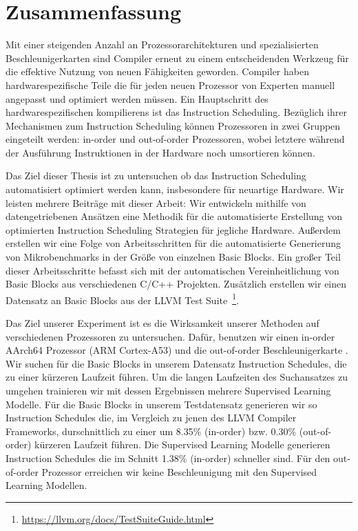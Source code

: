\chapter*{Zusammenfassung}
Mit einer steigenden Anzahl an Prozessorarchitekturen und spezialisierten Beschleunigerkarten sind Compiler erneut zu einem entscheidenden Werkzeug für die effektive Nutzung von neuen Fähigkeiten geworden.
Compiler haben hardwarespezifische Teile die für jeden neuen Prozessor von Experten manuell angepasst und optimiert werden müssen.
Ein Hauptschritt des hardwarespezifischen kompilierens ist das Instruction Scheduling.
Bezüglich ihrer Mechanismen zum Instruction Scheduling können Prozessoren in zwei Gruppen eingeteilt werden: in-order und out-of-order Prozessoren, wobei letztere während der Ausführung Instruktionen in der Hardware noch umsortieren können.

Das Ziel dieser Thesis ist zu untersuchen ob das Instruction Scheduling automatisiert optimiert werden kann, insbesondere für neuartige Hardware.
Wir leisten mehrere Beiträge mit dieser Arbeit:
Wir entwickeln mithilfe von datengetriebenen Ansätzen eine Methodik für die automatisierte Erstellung von optimierten Instruction Scheduling Strategien für jegliche Hardware.
Außerdem erstellen wir eine Folge von Arbeitsschritten für die automatisierte Generierung von Mikrobenchmarks in der Größe von einzelnen Basic Blocks.
Ein großer Teil dieser Arbeitsschritte befasst sich mit der automatischen Vereinheitlichung von Basic Blocks aus verschiedenen C/C++ Projekten.
Zusätzlich erstellen wir einen Datensatz an Basic Blocks aus der LLVM Test Suite~\footnote[1]{\url{https://llvm.org/docs/TestSuiteGuide.html}}.

Das Ziel unserer Experiment ist es die Wirksamkeit unserer Methoden auf verschiedenen Prozessoren zu untersuchen.
Dafür, benutzen wir einen in-order AArch64 Prozessor (ARM Cortex-A53) und die out-of-order Beschleunigerkarte \aurora.
Wir suchen für die Basic Blocks in unserem Datensatz Instruction Schedules, die zu einer kürzeren Laufzeit führen.
Um die langen Laufzeiten des Suchansatzes zu umgehen trainieren wir mit dessen Ergebnissen mehrere Supervised Learning Modelle.
Für die Basic Blocks in unserem Testdatensatz generieren wir so Instruction Schedules die, im Vergleich zu jenen des LLVM Compiler Frameworks, durschnittlich zu einer um 8.35\% (in-order) bzw. 0.30\% (out-of-order) kürzeren Laufzeit führen.
Die Supervised Learning Modelle generieren Instruction Schedules die im Schnitt 1.38\% (in-order) schneller sind.
Für den out-of-order Prozessor erreichen wir keine Beschleunigung mit den Supervised Learning Modellen.
